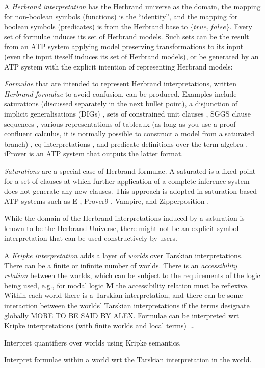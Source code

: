 \documentclass{easychair}
\newenvironment{packed_itemize}{
\vspace*{-0.3em}
\begin{itemize}
\setlength{\partopsep}{0pt}
\setlength{\itemsep}{1pt}
\setlength{\parskip}{0pt}
\setlength{\parsep}{0pt}
}{\end{itemize}}
\begin{document}
\vspace*{0.8em}
A {\em Herbrand interpretation} \cite{Her30} has the Herbrand universe as the domain, the mapping 
for non-boolean symbols (functions) is the ``identity'', and the mapping for boolean symbols 
(predicates) is from the Herbrand base to $\{true,false\}$.
Every set of formulae induces its set of Herbrand models.
Such sets can be the result from an ATP system applying model preserving transformations to its 
input (even the input iteself induces its set of Herbrand models), or be generated by an ATP 
system with the explicit intention of representing Herbrand models:
\begin{packed_itemize}
\item {\em Formulae} that are intended to represent Herbrand interpretations, written 
      {\em Herbrand-formulae} to avoid confusion, can be produced.
      Examples include saturations (discussed separately in the next bullet point), a disjunction 
      of implicit generalisations (DIGs) \cite{LM87}, sets of constrained unit clauses 
      \cite{CZ92,CP95,CP95-TAB}, SGGS clause sequences \cite{BP16}, various representations of 
      tableaux (as long as you use a proof confluent calculus, it is normally possible to construct 
      a model from a saturated branch) \cite{Hah01}, eq-interpretations \cite{Pel03-EQMC}, and 
      predicate definitions over the term algebra \cite{SK12}.
      iProver \cite{Kor08,SK12} is an ATP system that outputs the latter format.
\item {\em Saturations} \cite{BG+01,Pel03-JSC} are a special case of Herbrand-formulae.
      A saturated is a fixed point for a set of clauses at which further application of a 
      complete inference system does not generate any new clauses.
      This approach is adopted in saturation-based ATP systems such as E \cite{SCV19},
      Prover9 \cite{McC-Prover9-URL}, Vampire, and Zipperposition \cite{VB+21}.
\end{packed_itemize}
While the domain of the Herbrand interpretations induced by a saturation is known to be the 
Herbrand Universe, there might not be an explicit symbol interpretation that can be used 
constructively by users.

A {\em Kripke interpretation} \cite{Kri63} adds a layer of {\em worlds} over Tarskian 
interpretations.
There can be a finite or infinite number of worlds.
There is an {\em accessibility relation} between the worlds, which can be subject to the
requirements of the logic being used, e.g., for modal logic {\bf M} the accessibility 
relation must be reflexive.
Within each world there is a Tarskian interpretation, and there can be some interaction
between the worlds' Tarskian interpretations if the terms designate globally MORE TO BE SAID BY
ALEX.
Formulae can be interpreted wrt Kripke interpretations (with finite worlds and local terms)~\ldots
\begin{packed_itemize}
\item Interpret quantifiers over worlds using Kripke semantics.
\item Interpret formulae within a world wrt the Tarskian interpretation in the world.
\end{packed_itemize}
\end{document}
